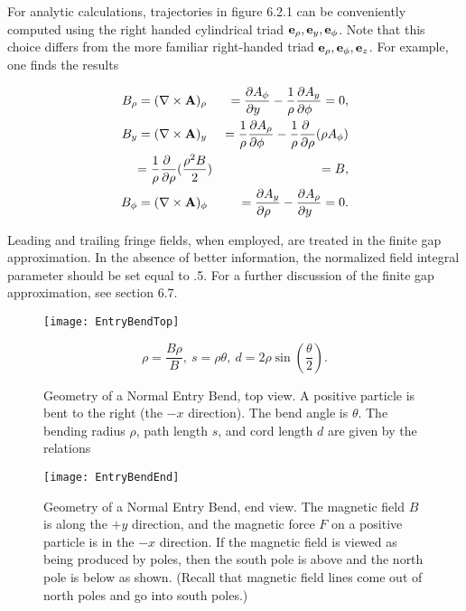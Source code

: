         For analytic calculations, trajectories in figure 6.2.1 can be conveniently
computed using the right handed cylindrical triad ${\bf e}_{\rho}, {\bf e}_y,
{\bf e}_{\phi}$.  Note that this choice differs from the more familiar
right-handed triad ${\bf e}_{\rho}, {\bf e}_{\phi}, {\bf e}_z$.  For example,
one finds the results

\pagebreak

\begin{eqnarray*}
  B_{\rho} & = (\nabla \times {\bf A})_{\rho} & = \frac{\partial A_{\phi}}{\partial y\ \ }
  - \frac{1}{\rho} \frac{\partial A_y}{\partial \phi\ \ }=0, \\
  B_y  & = (\nabla \times {\bf A})_y  & = \frac{1}{\rho}\frac{\partial A_{\rho}}{\partial\phi\ \ }-\frac{1}{\rho}\frac{\partial\ }{\partial \rho}
(\rho A_{\phi})\\
       &{\displaystyle = \frac{1}{\rho} \frac{\partial\ }{\partial \rho} (\frac{\rho ^2
B}{2}) }& = B, \\
  B_{\phi} & = (\nabla \times {\bf A})_{\phi} & = \frac{\partial A_y}{\partial \rho\ \ } -
  \frac{\partial A_{\rho}}{\partial y\ \ } = 0.
\end{eqnarray*}


     Leading and trailing fringe fields, when employed, are treated in the
finite gap approximation.  In the absence of better information, the normalized field integral parameter should be set equal to .5.  For a further discussion of the finite gap approximation, see section 6.7.

\begin{figure}[hp]
  \centering
  \texttt{[image: EntryBendTop]}
  \caption{Geometry of a Normal Entry Bend, top view.
A positive particle is bent to the right (the $-x$ direction).  The bend
angle is $\theta$.  The bending radius $\rho$, path length $s$, and cord length $d$ are
given by the relations}
\[  \rho = \frac{B\rho}{B},\ s = \rho\theta,\ d=2\rho\sin(\frac{\theta}{2}). \nonumber \]
\end{figure}

\begin{figure}[hp]
  \centering
  \texttt{[image: EntryBendEnd]}
  \caption{Geometry of a Normal Entry Bend, end view.
The magnetic field $B$ is along the $+y$ direction, and the magnetic force $F$ on
a positive particle is in the $-x$ direction.  If the magnetic field is
viewed as being produced by poles, then the south pole is above and the
north pole is below as shown.  (Recall that magnetic field lines come out of north poles and go into south poles.)}
\end{figure}

